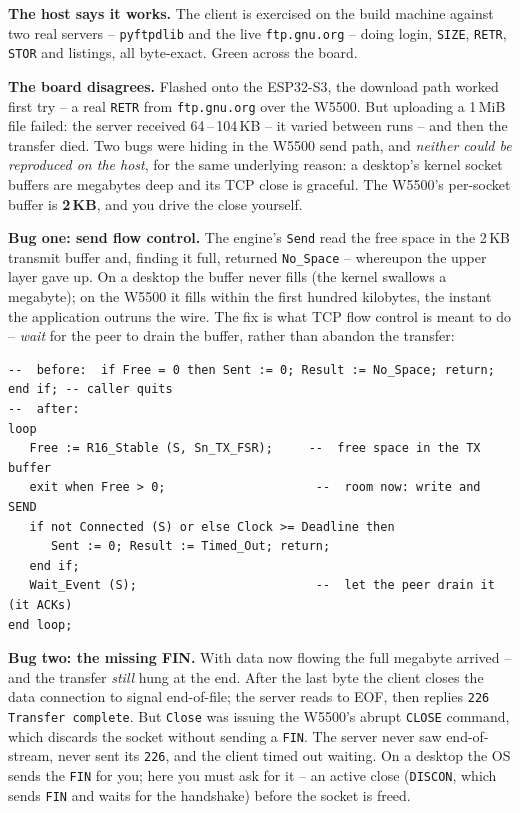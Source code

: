 \textbf{The host says it works.} The client is exercised on the build machine
against two real servers -- \texttt{pyftpdlib} and the live \texttt{ftp.gnu.org}
-- doing login, \texttt{SIZE}, \texttt{RETR}, \texttt{STOR} and listings, all
byte-exact. Green across the board.

\textbf{The board disagrees.} Flashed onto the ESP32-S3, the download path worked
first try -- a real \texttt{RETR} from \texttt{ftp.gnu.org} over the W5500. But
uploading a 1\,MiB file failed: the server received 64\,--\,104\,KB -- it varied
between runs -- and then the transfer died. Two bugs were hiding in the W5500 send
path, and \emph{neither could be reproduced on the host}, for the same underlying
reason: a desktop's kernel socket buffers are megabytes deep and its TCP close is
graceful. The W5500's per-socket buffer is \textbf{2\,KB}, and you drive the close
yourself.

\textbf{Bug one: send flow control.} The engine's \texttt{Send} read the free
space in the 2\,KB transmit buffer and, finding it full, returned
\texttt{No\_Space} -- whereupon the upper layer gave up. On a desktop the buffer
never fills (the kernel swallows a megabyte); on the W5500 it fills within the
first hundred kilobytes, the instant the application outruns the wire. The fix is
what TCP flow control is meant to do -- \emph{wait} for the peer to drain the
buffer, rather than abandon the transfer:

\begin{lstlisting}
--  before:  if Free = 0 then Sent := 0; Result := No_Space; return; end if; -- caller quits
--  after:
loop
   Free := R16_Stable (S, Sn_TX_FSR);     --  free space in the TX buffer
   exit when Free > 0;                     --  room now: write and SEND
   if not Connected (S) or else Clock >= Deadline then
      Sent := 0; Result := Timed_Out; return;
   end if;
   Wait_Event (S);                         --  let the peer drain it (it ACKs)
end loop;
\end{lstlisting}

\textbf{Bug two: the missing FIN.} With data now flowing the full megabyte
arrived -- and the transfer \emph{still} hung at the end. After the last byte the
client closes the data connection to signal end-of-file; the server reads to EOF,
then replies \texttt{226 Transfer complete}. But \texttt{Close} was issuing the
W5500's abrupt \texttt{CLOSE} command, which discards the socket without sending a
\texttt{FIN}. The server never saw end-of-stream, never sent its \texttt{226}, and
the client timed out waiting. On a desktop the OS sends the \texttt{FIN} for you;
here you must ask for it -- an active close (\texttt{DISCON}, which sends
\texttt{FIN} and waits for the handshake) before the socket is freed.

